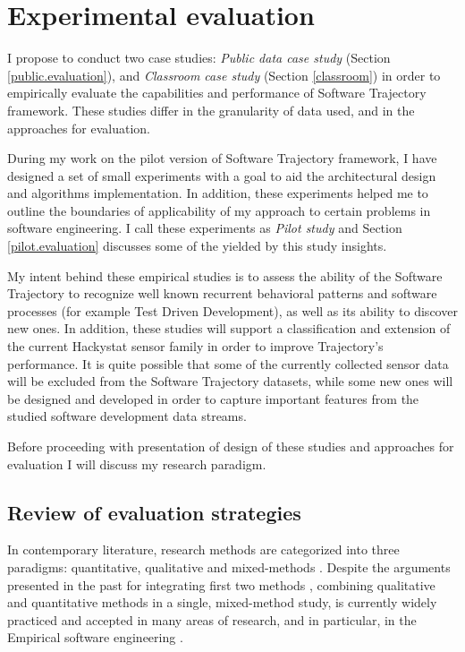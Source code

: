 \chapter{Experimental evaluation} \label{experiments}
I propose to conduct two case studies: \textit{Public data case study} (Section \ref{public.evaluation}), and \textit{Classroom case study} (Section \ref{classroom}) in order to empirically evaluate the capabilities and performance of Software Trajectory framework. These studies differ in the granularity of data used, and in the approaches for evaluation. 

During my work on the pilot version of Software Trajectory framework, I have designed a set of small experiments with a goal to aid the architectural design and algorithms implementation. In addition, these experiments helped me to outline the boundaries of applicability of my approach to certain problems in software engineering. I call these experiments as \textit{Pilot study} and Section \ref{pilot.evaluation} discusses some of the yielded by this study insights.

My intent behind these empirical studies is to assess the ability of the Software Trajectory to recognize well known recurrent behavioral patterns and software processes (for example Test Driven Development), as well as its ability to discover new ones. In addition, these studies will support a classification and extension of the current Hackystat sensor family in order to improve Trajectory's performance. It is quite possible that some of the currently collected sensor data will be excluded from the Software Trajectory datasets, while some new ones will be designed and developed in order to capture important features from the studied software development data streams. 

Before proceeding with presentation of design of these studies and approaches for evaluation I will discuss my research paradigm.

\section{Review of evaluation strategies}
In contemporary literature, research methods are categorized into three paradigms: quantitative, qualitative and mixed-methods  \cite{citeulike:5410262}. Despite the arguments presented in the past for integrating first two methods \cite{GubaLincoln-CompetingParadigms}, combining qualitative and quantitative methods in a single, mixed-method study, is currently widely practiced and accepted in many areas of research, and in particular, in the Empirical software engineering \cite{citeulike:5361927} \cite{citeulike:5361791}. 

